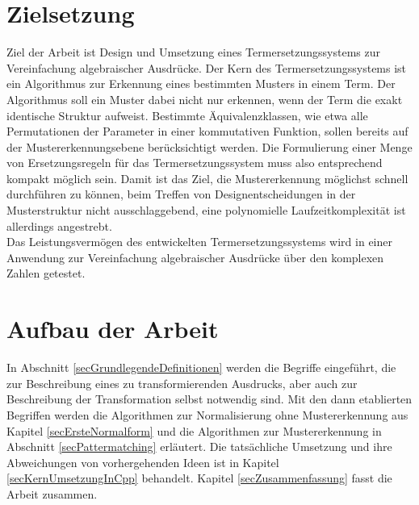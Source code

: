 \section{Zielsetzung}
Ziel der Arbeit ist Design und Umsetzung eines Termersetzungssystems zur Vereinfachung algebraischer Ausdrücke. Der Kern des Termersetzungssystems ist ein Algorithmus zur Erkennung eines bestimmten Musters in einem Term. 
Der Algorithmus soll ein Muster dabei nicht nur erkennen, wenn der Term die exakt identische Struktur aufweist. Bestimmte Äquivalenzklassen, wie etwa alle Permutationen der Parameter in einer kommutativen Funktion, sollen bereits auf der Mustererkennungsebene berücksichtigt werden. Die Formulierung einer Menge von Ersetzungsregeln für das Termersetzungssystem muss also entsprechend kompakt möglich sein. 
Damit ist das Ziel, die Mustererkennung möglichst schnell durchführen zu können, beim Treffen von Designentscheidungen in der Musterstruktur nicht ausschlaggebend, eine polynomielle Laufzeitkomplexität ist allerdings angestrebt.\\
Das Leistungsvermögen des entwickelten Termersetzungssystems wird in einer Anwendung zur Vereinfachung algebraischer Ausdrücke über den komplexen Zahlen getestet. 

\section{Aufbau der Arbeit}
In Abschnitt \ref{secGrundlegendeDefinitionen} werden die Begriffe eingeführt, die zur Beschreibung eines zu transformierenden Ausdrucks, aber auch zur Beschreibung der Transformation selbst notwendig sind. Mit den dann etablierten Begriffen werden die Algorithmen zur Normalisierung ohne Mustererkennung aus Kapitel \ref{secErsteNormalform} und die Algorithmen zur Mustererkennung in Abschnitt \ref{secPattermatching} erläutert. 
Die tatsächliche Umsetzung und ihre Abweichungen von vorhergehenden Ideen ist in Kapitel \ref{secKernUmsetzungInCpp} behandelt. 
Kapitel \ref{secZusammenfassung} fasst die Arbeit zusammen.



